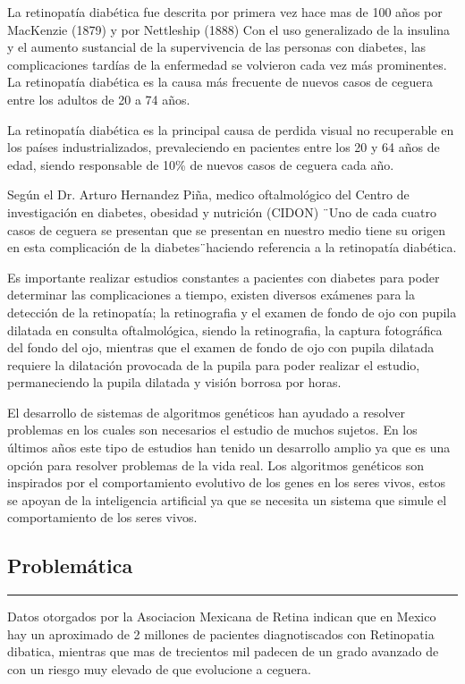 \documentclass[12pt,letterpaper]{article}
\begin{document}
La retinopatía diabética fue descrita por primera vez 
hace mas de 100 años por MacKenzie (1879) y por Nettleship (1888) Con el uso generalizado de la insulina y el aumento sustancial de la supervivencia de las personas con diabetes, las complicaciones tardías de la enfermedad se volvieron cada vez más prominentes.
La retinopatía diabética es la causa más frecuente de nuevos casos de ceguera entre los adultos de 20 a 74 años.\cite{Dosal}

La retinopatía diabética es la principal causa de perdida visual no recuperable en los países industrializados, prevaleciendo en pacientes entre los 20 y 64 años de edad, siendo responsable de 10\% de nuevos casos de ceguera cada año.\cite{Aliseda}
 
Según el Dr. Arturo Hernandez Piña, medico oftalmológico del Centro de investigación en diabetes, obesidad y nutrición (CIDON) \"\ Uno de cada cuatro casos de ceguera se presentan que se presentan en nuestro medio tiene su origen en esta complicación de la diabetes\"\ haciendo referencia a la retinopatía diabética.

Es importante realizar estudios constantes a pacientes con diabetes para poder determinar las complicaciones a tiempo, existen diversos exámenes para la detección de la retinopatía; la retinografia y el examen de fondo de ojo con pupila dilatada en consulta oftalmológica, siendo la retinografia, la captura fotográfica del fondo del ojo, mientras que el examen de fondo de ojo con pupila dilatada requiere la dilatación provocada de la pupila para poder realizar el estudio, permaneciendo la pupila dilatada y visión borrosa por horas.


El desarrollo de sistemas de algoritmos genéticos han ayudado a resolver problemas en los cuales son necesarios el estudio de muchos sujetos. En los últimos años este tipo de estudios han tenido un desarrollo amplio ya que es una opción para resolver problemas de la vida real.
Los algoritmos genéticos son inspirados por el comportamiento evolutivo de los genes en los seres vivos, estos se apoyan de la inteligencia artificial ya que se necesita un sistema que simule el comportamiento de los seres vivos.

\newpage

\begin{center}
	\section{Problemática}
	\hrule
\end{center}
Datos otorgados por la Asociacion Mexicana de Retina indican que en Mexico hay un aproximado de 2 millones de pacientes diagnotiscados con Retinopatia dibatica, mientras que mas de trecientos mil padecen de un grado avanzado de con un riesgo muy elevado de que evolucione a ceguera.
\end{document}
